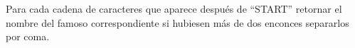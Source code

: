 \outputText

Para cada cadena de caracteres que aparece después de “START” retornar el nombre del famoso correspondiente si hubiesen más de dos enconces separarlos por coma.

\exampleCases

\begin{example}
\end{example}